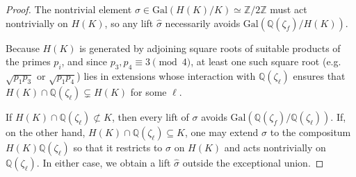 \documentclass[10pt,a4paper]{amsart}
\newcommand\Gal{{\mathrm {Gal}}}
\newcommand{\Q}{\mathbb{Q}}
\newcommand{\Z}{\mathbb{Z}}
\begin{document}
\begin{proof}
The nontrivial element $\sigma\in\Gal(H(K)/K)\simeq\Z/2\Z$ must act
nontrivially on $H(K)$, so any lift $\hat{\sigma}$ necessarily avoids
$\Gal(\Q(\zeta_f)/H(K))$.

Because $H(K)$ is generated by adjoining square roots of suitable products of
the primes $p_i$, and since $p_3,p_4\equiv3\pmod4$, at least one such square
root (e.g.\ $\sqrt{p_1p_3}$ or $\sqrt{p_1p_4}$) lies in 
extensions whose interaction with $\Q(\zeta_\ell)$ ensures that 
$H(K)\cap\Q(\zeta_\ell)\subsetneq H(K)$ for some $\ell$.

If $H(K)\cap\Q(\zeta_\ell)\not\subset K$, then every lift of $\sigma$ avoids
$\Gal(\Q(\zeta_f)/\Q(\zeta_\ell))$.  
If, on the other hand, $H(K)\cap\Q(\zeta_\ell)\subseteq K$, one may extend
$\sigma$ to the compositum $H(K)\Q(\zeta_\ell)$ so that it restricts to
$\sigma$ on $H(K)$ and acts nontrivially on $\Q(\zeta_\ell)$.  
In either case, we obtain a lift $\hat{\sigma}$ outside the exceptional
union.
\end{proof}
\end{document}
